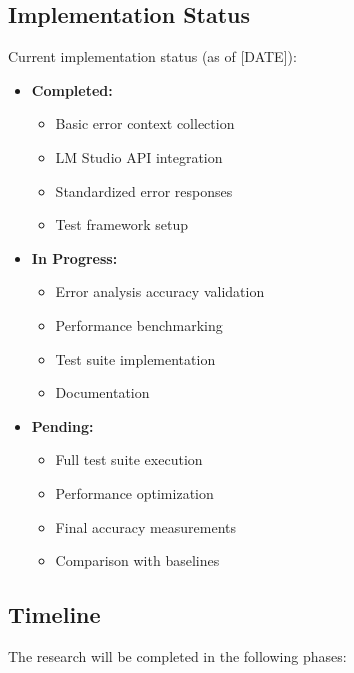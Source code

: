 \subsection{Implementation Status}
Current implementation status (as of [DATE]):

\begin{itemize}
    \item \textbf{Completed:}
    \begin{itemize}
        \item Basic error context collection
        \item LM Studio API integration
        \item Standardized error responses
        \item Test framework setup
    \end{itemize}
    \item \textbf{In Progress:}
    \begin{itemize}
        \item Error analysis accuracy validation
        \item Performance benchmarking
        \item Test suite implementation
        \item Documentation
    \end{itemize}
    \item \textbf{Pending:}
    \begin{itemize}
        \item Full test suite execution
        \item Performance optimization
        \item Final accuracy measurements
        \item Comparison with baselines
    \end{itemize}
\end{itemize}

\subsection{Timeline}
The research will be completed in the following phases:

